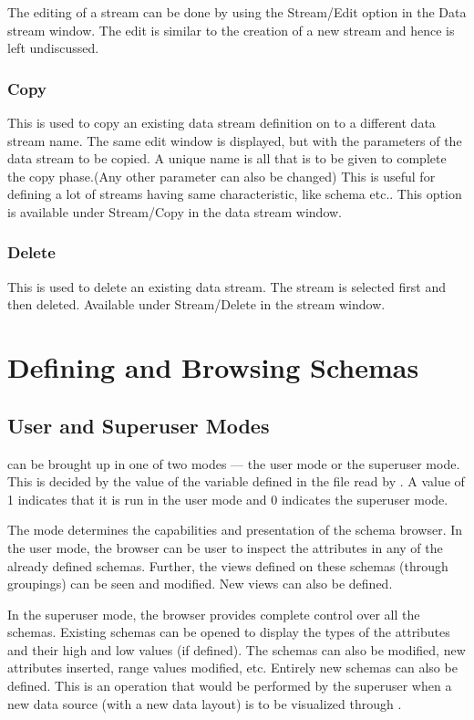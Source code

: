 The editing of a stream can be done by using the Stream/Edit option in the Data stream window. The edit is similar to the creation of a new stream and hence is left undiscussed. 

\subsubsection{Copy}

This is used to copy an existing  data stream definition on to a different data stream name. The same edit window is displayed, but with the parameters of the data stream to be copied. A unique name is all that is to be given to complete the copy phase.(Any other parameter can also be changed) This is useful for defining a lot of streams having same characteristic, like schema etc.. This option is available under Stream/Copy in the data stream window.

\subsubsection{Delete}

This is used to delete an existing  data stream. The stream is selected first and then deleted. Available under Stream/Delete in the stream window.

\section{Defining and Browsing Schemas}

\subsection{User and Superuser Modes}

\Devise can be brought up in one of two modes --- the user mode or the
superuser mode.  This is decided by the value of the variable
 defined in the  file read by
\Devise.  A value of 1 indicates that it is run in the user mode and 0
indicates the superuser mode.

The mode determines the capabilities and presentation of the schema
browser.  In the user mode, the browser can be user to inspect the
attributes in any of the already defined schemas. Further, the views
defined on these schemas (through groupings) can be seen and
modified. New views can also be defined.

In the superuser mode, the browser provides complete control over all
the schemas. Existing schemas can be opened to display the types of
the attributes and their high and low values (if defined). The schemas
can also be modified, new attributes inserted, range values modified,
etc. Entirely new schemas can also be defined.  This is an operation
that would be performed by the superuser when a new data source (with
a new data layout) is to be visualized through \Devise.

